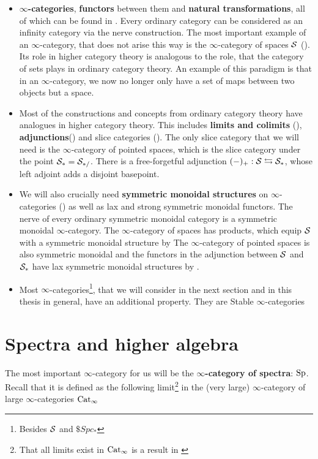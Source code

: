 \begin{itemize}
    \item \textbf{$\infty$-categories}, \textbf{functors} between them and \textbf{natural transformations}, all of which can be found in \cite[Chapter~1]{HigherToposTheory}. Every ordinary category can be considered as an infinity category via the nerve construction. The most important example of an $\infty$-category, that does not arise this way is the $\infty$-category of spaces $\mathcal{S}$ (\cite[Section~1.2.6]{HigherToposTheory}). Its role in higher category theory is analogous to the role, that the category of sets plays in ordinary category theory. An example of this paradigm is that in an $\infty$-category, we now no longer only have a set of maps between two objects but a space.
    \item Most of the constructions and concepts from ordinary category theory have analogues in higher category theory. This includes \textbf{limits and colimits} (\cite[Section~1.2.3, Chapter~4]{HigherToposTheory}), \textbf{adjunctions}(\cite[\href{https://kerodon.net/tag/02EJ}{Tag 02EJ}]{kerodon}) and slice categories (\cite[Section~1.2.9]{HigherToposTheory}). The only slice category that we will need is the $\infty$-category of pointed spaces, which is the slice category under the point $\mathcal{S}_*=\mathcal{S}_{*/}$. There is a free-forgetful adjunction $(-)_+:\mathcal{S}\leftrightarrows \mathcal{S}_*$, whose left adjoint adds a disjoint basepoint.
    \item We will also crucially need \textbf{symmetric monoidal structures} on $\infty$-categories (\cite[Definition~2.0.0.7]{lurie2017higher}) as well as lax and strong symmetric monoidal functors. The nerve of every ordinary symmetric monoidal category is a symmetric monoidal $\infty$-category.
    The $\infty$-category of spaces has products, which equip $\mathcal{S}$ with a symmetric monoidal structure by \cite[Section~2.4.1]{lurie2017higher}
    The $\infty$-category of pointed spaces is also symmetric monoidal and the functors in the adjunction between $\mathcal{S}$ and $\mathcal{S}_*$ have lax symmetric monoidal structures by \cite[Theorem~2.2.2.4]{lurie2017higher}. 
    \item Most $\infty$-categories\footnote{Besides $\mathcal{S}$ and $\$Spc_*$}, that we will consider in the next section and in this thesis in general, have an additional property. They are Stable $\infty$-categories \cite[Section~1.1]{lurie2017higher}
    
\end{itemize}
\section{Spectra and higher algebra}
The most important $\infty$-category for us will be the\textbf{ $\infty$-category of spectra}: $\operatorname{Sp}$. Recall that it is defined as the following limit\footnote{That all limits exist in $\operatorname{Cat}_\infty$ is a result in \cite[Section~3.3.3]{HigherToposTheory}} in the (very large) $\infty$-category of large $\infty$-categories $\operatorname{Cat}_\infty$

